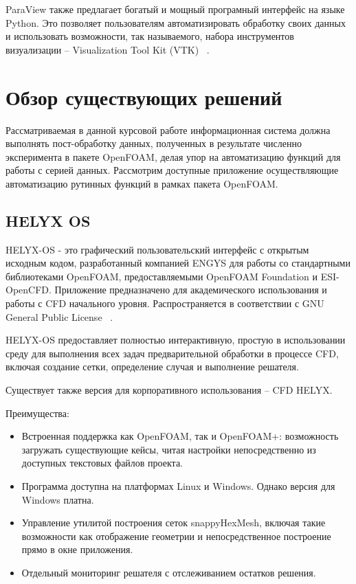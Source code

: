 \documentclass[14pt]{extreport}
\begin{document}
ParaView также предлагает богатый и мощный програмный интерфейс на языке Python. Это позволяет пользователям автоматизировать обработку своих данных и использовать возможности, так называемого, набора инструментов визуализации -- Visualization Tool Kit (VTK) ~\cite{ParaviewAndPython}.

\chapter{Обзор существующих решений}
Рассматриваемая в данной курсовой работе информационная система должна выполнять пост-обработку данных, полученных в результате численно эксперимента в пакете OpenFOAM, делая упор на автоматизацию функций для работы с серией данных. Рассмотрим доступные приложение осуществляющие автоматизацию рутинных функций в рамках пакета OpenFOAM.
\section{HELYX OS}
HELYX-OS - это графический пользовательский интерфейс с открытым исходным кодом, разработанный компанией ENGYS для работы со стандартными библиотеками OpenFOAM, предоставляемыми OpenFOAM Foundation и ESI-OpenCFD. Приложение предназначено для академического использования и работы с CFD начального уровня. Распространяется в соответствии с GNU General Public License ~\cite{Helyx}.

HELYX-OS предоставляет полностью интерактивную, простую в использовании среду для выполнения всех задач предварительной обработки в процессе CFD, включая создание сетки, определение случая и выполнение решателя.

Существует также версия для корпоративного использования -- CFD HELYX.

Преимущества: 
\begin{itemize}
\item Встроенная поддержка как OpenFOAM, так и OpenFOAM+: возможность загружать существующие кейсы, читая настройки непосредственно из доступных текстовых файлов проекта.
\item Программа доступна на платформах Linux и Windows. Однако версия для Windows платна.
\item Управление утилитой построения сеток snappyHexMesh, включая такие возможности как отображение геометрии и непосредственное построение прямо в окне приложения.
\item Отдельный мониторинг решателя с отслеживанием остатков решения.
\end{itemize}
\end{document}
